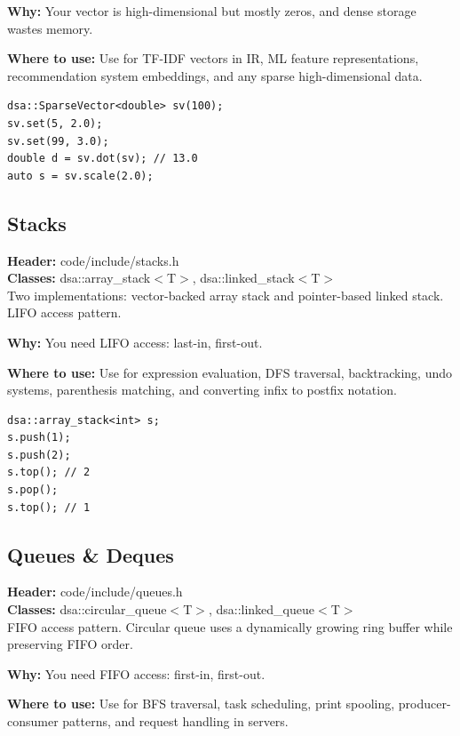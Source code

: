 \documentclass[11pt]{article}
\begin{document}
\textbf{Why:} Your vector is high-dimensional but mostly zeros, and dense storage wastes memory. \par \textbf{Where to use:} Use for TF-IDF vectors in IR, ML feature representations, recommendation system embeddings, and any sparse high-dimensional data.

\begin{lstlisting}
dsa::SparseVector<double> sv(100);
sv.set(5, 2.0);
sv.set(99, 3.0);
double d = sv.dot(sv); // 13.0
auto s = sv.scale(2.0);
\end{lstlisting}

\subsection{Stacks}
\textbf{Header:} code/include/stacks.h\\
\textbf{Classes:} dsa::array\_stack$<$T$>$, dsa::linked\_stack$<$T$>$\\

Two implementations: vector-backed array stack and pointer-based linked stack. LIFO access pattern.

\textbf{Why:} You need LIFO access: last-in, first-out. \par \textbf{Where to use:} Use for expression evaluation, DFS traversal, backtracking, undo systems, parenthesis matching, and converting infix to postfix notation.

\begin{lstlisting}
dsa::array_stack<int> s;
s.push(1);
s.push(2);
s.top(); // 2
s.pop();
s.top(); // 1
\end{lstlisting}

\subsection{Queues \& Deques}
\textbf{Header:} code/include/queues.h\\
\textbf{Classes:} dsa::circular\_queue$<$T$>$, dsa::linked\_queue$<$T$>$\\

FIFO access pattern. Circular queue uses a dynamically growing ring buffer while preserving FIFO order.

\textbf{Why:} You need FIFO access: first-in, first-out. \par \textbf{Where to use:} Use for BFS traversal, task scheduling, print spooling, producer-consumer patterns, and request handling in servers.
\end{document}
